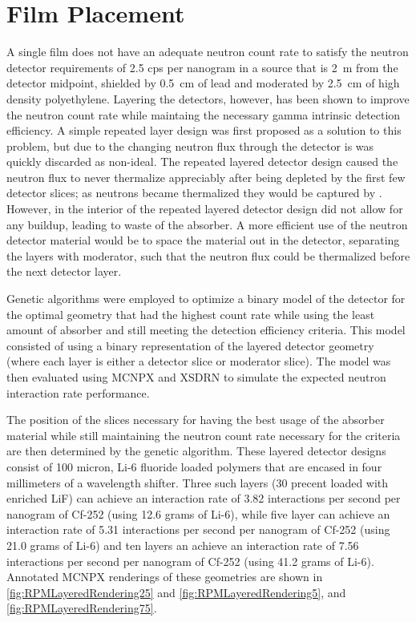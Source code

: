 \section{Film Placement}
A single film does not have an adequate neutron count rate to satisfy the neutron detector requirements of 2.5 cps per nanogram  in a source that is \SI{2}{\m} from the detector midpoint, shielded by \SI{0.5}{\cm} of lead and moderated by \SI{2.5}{\cm} of high density polyethylene.
Layering the detectors, however, has been shown to improve the neutron count rate while maintaing the necessary gamma intrinsic detection efficiency.
A simple repeated layer design was first proposed as a solution to this problem, but due to the changing neutron flux through the detector is was quickly discarded as non-ideal.
The repeated layered detector design caused the neutron flux to never thermalize appreciably after being depleted by the first few detector slices; as neutrons became thermalized they would be captured by .
However, in the interior of the repeated layered detector design did not allow for any buildup, leading to waste of the absorber.
A more efficient use of the neutron detector material would be to space the material out in the detector, separating the layers with moderator, such that the neutron flux could be thermalized before the next detector layer.

Genetic algorithms were employed to optimize a binary model of the detector for the optimal geometry that had the highest count rate while using the least amount of absorber and still meeting the detection efficiency criteria.
This model consisted of using a binary representation of the layered detector geometry (where each layer is either a detector slice or moderator slice).
The model was then evaluated using MCNPX and XSDRN to simulate the expected neutron interaction rate performance.

The position of the slices necessary for having the best usage of the absorber material while still maintaining the neutron count rate necessary for the criteria are then determined by the genetic algorithm.
These layered detector designs consist of 100 micron, Li-6 fluoride loaded polymers that are encased in four millimeters of a wavelength shifter.
Three such layers (30 precent loaded with enriched LiF) can achieve an interaction rate of 3.82 interactions per second per nanogram of Cf-252 (using 12.6 grams of Li-6), while five layer can achieve an interaction rate of 5.31 interactions per second per nanogram of Cf-252 (using 21.0 grams of Li-6)  and ten layers an achieve an interaction rate of 7.56 interactions per second per nanogram of Cf-252 (using 41.2 grams of Li-6).
Annotated MCNPX renderings of these geometries are shown in \autoref{fig:RPMLayeredRendering25} and \autoref{fig:RPMLayeredRendering5}, and \autoref{fig:RPMLayeredRendering75}.

